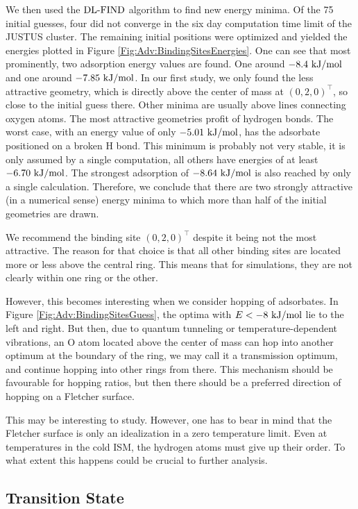 \documentclass[8.5pt,twoside,twocolumn]{article}
\newcommand\dlfind{\enmat{\te{DL-FIND}}}
\newcommand\kmo{\enmat{\te {kJ/mol}}}
\theoremstyle{standard}
\begin{document}
We then used the $\dlfind$ algorithm to find new energy minima. Of the 75
initial guesses, four did not converge in the six day computation time limit
of the JUSTUS cluster. The remaining initial positions were optimized
and yielded the energies plotted in Figure \ref{Fig:Adv:BindingSitesEnergies}.
One can see that most prominently, two adsorption energy values are found. One
around $-8.4~\kmo$ and one around $-7.85~\kmo$. In our first study, we only
found the less attractive geometry, which is directly above the center of mass
at $(0,2,0)^\intercal$, so close to the initial guess there. Other minima are
usually above lines connecting oxygen atoms. The most attractive geometries
profit of hydrogen bonds. The worst case, with an energy value of only
$-5.01~\kmo$, has the adsorbate positioned on a broken H bond. This minimum is
probably not very stable, it is only assumed by a single computation, all
others have energies of at least $-6.70~\kmo$. The strongest adsorption of
$-8.64~\kmo$ is also reached by only a single calculation. Therefore, we
conclude that there are two strongly attractive (in a numerical sense) energy
minima to which more than half of the initial geometries are drawn.

We recommend the binding site $(0,2,0)^\intercal$ despite it being not the most
attractive. The reason for that choice is that all other binding sites are
located more or less above the central ring. This means that for simulations,
they are not clearly within one ring or the other.

However, this becomes interesting when we consider hopping of adsorbates. In
Figure \ref{Fig:Adv:BindingSitesGuess}, the optima with $E<-8~\kmo$ lie to the
left and right. But then, due to quantum tunneling or temperature-dependent
vibrations, an O atom located above the center of mass can hop into another
optimum at the boundary of the ring, we may call it a transmission optimum, and
continue hopping into other rings from there. This mechanism should be
favourable for hopping ratios, but then there should be a preferred direction
of hopping on a Fletcher surface.

This may be interesting to study. However, one has to bear in mind that the
Fletcher surface is only an idealization in a zero temperature limit. Even at
temperatures in the cold ISM, the hydrogen atoms must give up their order. To
what extent this happens could be crucial to further analysis.


\subsection{Transition State}
\label{Sec:Adv:Trans}
\newcommand\hoht{\mbox{\enmat{\ho+\htw}}}
\end{document}
